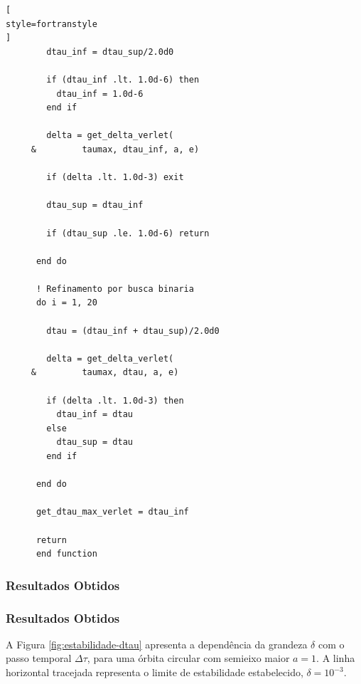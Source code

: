 \documentclass[12pt,a4paper]{article}
\begin{document}
\begin{lstlisting}[
style=fortranstyle
]
        dtau_inf = dtau_sup/2.0d0

        if (dtau_inf .lt. 1.0d-6) then
          dtau_inf = 1.0d-6
        end if

        delta = get_delta_verlet(
     &         taumax, dtau_inf, a, e)

        if (delta .lt. 1.0d-3) exit

        dtau_sup = dtau_inf

        if (dtau_sup .le. 1.0d-6) return

      end do

      ! Refinamento por busca binaria
      do i = 1, 20

        dtau = (dtau_inf + dtau_sup)/2.0d0

        delta = get_delta_verlet(
     &         taumax, dtau, a, e)

        if (delta .lt. 1.0d-3) then
          dtau_inf = dtau
        else
          dtau_sup = dtau
        end if

      end do

      get_dtau_max_verlet = dtau_inf

      return
      end function
\end{lstlisting}


\subsubsection{Resultados Obtidos}

\subsubsection{Resultados Obtidos}

A Figura \ref{fig:estabilidade-dtau} apresenta a
dependência da grandeza $\delta$ com o passo temporal
$\Delta\tau$, para uma órbita circular com semieixo
maior $a=1$. A linha horizontal tracejada representa
o limite de estabilidade estabelecido,
$\delta=10^{-3}$.
\end{document}
